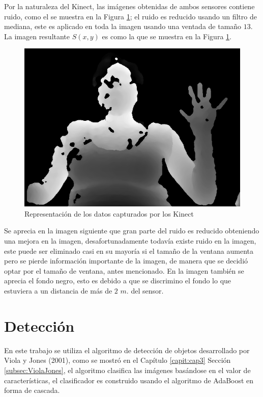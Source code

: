 Por la naturaleza del Kinect, las imágenes obtenidas de ambos sensores contiene ruido, como el se muestra en la Figura \ref{fig:ImagenCapturadaNoNoise}; el ruido es reducido usando un filtro de mediana, este es aplicado en toda la imagen usando una ventada de tamaño $13$. La imagen resultante $S(x,y)$ es como la que se muestra en la Figura \ref{fig:ImagenCapturadaNoNoise}.\\ 
\begin{figure}[h!]
\begin{center}
\includegraphics[scale=.35]{./Figures/166_W13.png}
\end{center}
\caption{Representación de los datos capturados por los Kinect}
\label{fig:ImagenCapturadaNoNoise}
\end{figure}  
Se aprecia en la imagen siguiente  que gran parte del ruido es reducido obteniendo una mejora en la imagen, desafortunadamente todavía existe ruido en la imagen, este puede ser eliminado casi en su mayoría  si el tamaño de la ventana aumenta pero se pierde información importante de la imagen, de manera que se decidió optar por el tamaño de ventana, antes mencionado. En la imagen también se aprecia el fondo negro, esto es debido a que se discrimino el fondo lo que estuviera a un distancia de más de $2$ $m.$ del sensor. 



\section{Detección}\label{sec:DeteccionSystem} 

En este trabajo se utiliza el algoritmo de detección de objetos desarrollado por Viola y Jones (2001), como se mostró en el Cap\'itulo \ref{capit:cap3} Sección \ref{subsec:ViolaJones}, el algoritmo clasifica las imágenes basándose en el valor de características, el clasificador es construido usando el algoritmo de AdaBoost en forma de cascada. 


